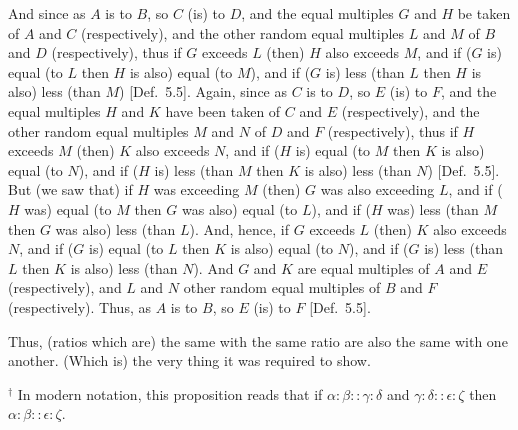 \begin{Parallel}{}{}
{\epsfysize=0.75in
\centerline{}

And since as $A$ is to $B$, so $C$ (is) to $D$, and the equal multiples $G$ and $H$
be taken of $A$ and $C$ (respectively), and the other random equal
multiples $L$ and $M$ of $B$ and $D$ (respectively),  thus if $G$ exceeds $L$ (then)
$H$ also exceeds $M$, and if ($G$ is) equal (to $L$ then $H$ is also)
equal (to $M$), and if ($G$ is) less (than $L$ then $H$ is also) less (than $M$)  [Def.~5.5]. Again, since as $C$ is to $D$, so $E$
(is) to $F$, and the equal multiples $H$ and $K$ have been taken of $C$ and $E$
(respectively), and the other random equal multiples $M$ and $N$ of
$D$ and $F$ (respectively), thus if $H$ exceeds $M$ (then)
$K$ also exceeds $N$, and if ($H$ is) equal  (to $M$ then $K$ is also)
equal (to $N$), and if ($H$ is) less (than $M$  then $K$ is also) less (than $N$) [Def.~5.5]. But (we saw that) if $H$ was exceeding $M$ (then) $G$ was also
exceeding $L$, and if ($H$ was) equal (to $M$ then $G$ was also)
equal (to $L$), and if ($H$ was) less (than $M$ then $G$ was also) less (than $L$).
And, hence, if $G$ exceeds $L$ (then)
$K$ also exceeds $N$, and if ($G$ is) equal (to $L$ then $K$ is also)  equal (to $N$), and if ($G$ is) less (than $L$ then $K$ is also) less (than $N$). And $G$ and $K$ are equal multiples of $A$ and $E$ (respectively), and $L$ and $N$
other random equal multiples of $B$ and $F$ (respectively). Thus, as $A$ is to $B$,
so $E$ (is) to $F$ [Def.~5.5].

Thus, (ratios which are) the same with the same ratio  are also the same with one another. (Which is) the very thing it was required to show.}
\end{Parallel}
{\footnotesize \noindent$^\dag$ In modern notation, this proposition
reads that if $\alpha:\beta::\gamma:\delta$ and $\gamma:\delta::\epsilon:\zeta$ then $\alpha:\beta::\epsilon:\zeta$.}

